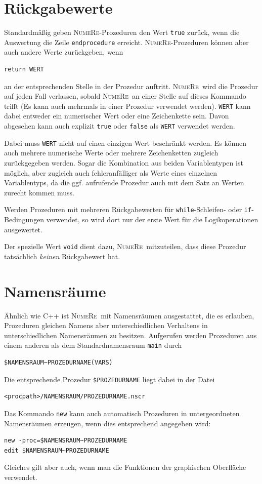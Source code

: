 \documentclass[DIV=14,headsepline,footsepline]{scrbook}
\newcommand{\NR}{\textsc{Nu\-me\-Re}}
\begin{document}
			\section{Rückgabewerte}
				Standardmäßig geben \NR-Prozeduren den Wert \verb+true+ zurück, wenn die Auswertung die Zeile \verb+endprocedure+ erreicht. \NR-Prozeduren können aber auch andere Werte zurückgeben, wenn
				\begin{lstlisting}
return WERT
				\end{lstlisting}
				an der entsprechenden Stelle in der Prozedur auftritt. \NR\ wird die Prozedur auf jeden Fall verlassen, sobald \NR\ an einer Stelle auf dieses Kommando trifft (Es kann auch mehrmals in einer Prozedur verwendet werden). \verb+WERT+ kann dabei entweder ein numerischer Wert oder eine Zeichenkette sein. Davon abgesehen kann auch explizit \verb+true+ oder \verb+false+ als \verb+WERT+ verwendet werden.
				
				Dabei muss \verb+WERT+ nicht auf einen einzigen Wert beschränkt werden. Es können auch mehrere numerische Werte oder mehrere Zeichenketten zugleich zurückgegeben werden. Sogar die Kombination aus beiden Variablentypen ist möglich, aber zugleich auch fehleranfälliger als Werte eines einzelnen Variablentyps, da die ggf. aufrufende Prozedur auch mit dem Satz an Werten zurecht kommen muss.
				
				Werden Prozeduren mit mehreren Rückgabewerten für \verb+while+-Schleifen- oder \verb+if+-Bedingungen verwendet, so wird dort nur der erste Wert für die Logikoperationen ausgewertet.
				
				Der spezielle Wert \verb+void+ dient dazu, \NR\ mitzuteilen, dass diese Prozedur tatsächlich \emph{keinen} Rückgabewert hat.
			\section{Namensräume}
				Ähnlich wie C++ ist \NR\ mit Namensräumen ausgestattet, die es erlauben, Prozeduren gleichen Namens aber unterschiedlichen Verhaltens in unterschiedlichen Namensräumen zu besitzen. Aufgerufen werden Prozeduren aus einem anderen als dem Standardnamensraum \verb+main+ durch 
				\begin{lstlisting}
$NAMENSRAUM~PROZEDURNAME(VARS)
				\end{lstlisting}
				Die entsprechende Prozedur \verb+$PROZEDURNAME+ liegt dabei in der Datei 
				\begin{lstlisting}
<procpath>/NAMENSRAUM/PROZEDURNAME.nscr
				\end{lstlisting}
				Das Kommando \verb+new+ kann auch automatisch Prozeduren in untergeordneten Namensräumen erzeugen, wenn dies entsprechend angegeben wird:
				\begin{lstlisting}
new -proc=$NAMENSRAUM~PROZEDURNAME
edit $NAMENSRAUM~PROZEDURNAME
				\end{lstlisting}
				Gleiches gilt aber auch, wenn man die Funktionen der graphischen Oberfläche verwendet.
				
\end{document}
